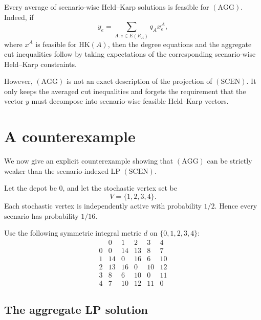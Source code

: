 \documentclass[11pt]{article}
\newcommand{\HK}{\mathrm{HK}}
\begin{document}
Every average of scenario-wise Held--Karp solutions is feasible for \((\mathrm{AGG})\). Indeed, if
\[
y_e=\sum_{A:e\in E(R_A)}q_Ax^A_e,
\]
where $x^A$ is feasible for $\HK(A)$, then the degree equations and the aggregate cut inequalities follow by taking expectations of the corresponding scenario-wise Held--Karp constraints.

However, \((\mathrm{AGG})\) is not an exact description of the projection of \((\mathrm{SCEN})\). It only keeps the averaged cut inequalities and forgets the requirement that the vector $y$ must decompose into scenario-wise feasible Held--Karp vectors.

\section{A counterexample}

We now give an explicit counterexample showing that \((\mathrm{AGG})\) can be strictly weaker than the scenario-indexed LP \((\mathrm{SCEN})\).

Let the depot be $0$, and let the stochastic vertex set be
\[
V=\{1,2,3,4\}.
\]
Each stochastic vertex is independently active with probability $1/2$. Hence every scenario has probability $1/16$.

Use the following symmetric integral metric $d$ on $\{0,1,2,3,4\}$:
\[
\begin{array}{c|ccccc}
 & 0 & 1 & 2 & 3 & 4 \\
\hline
0 & 0 & 14 & 13 & 8 & 7 \\
1 & 14 & 0 & 16 & 6 & 10 \\
2 & 13 & 16 & 0 & 10 & 12 \\
3 & 8 & 6 & 10 & 0 & 11 \\
4 & 7 & 10 & 12 & 11 & 0
\end{array}
\]

\subsection{The aggregate LP solution}
\end{document}
